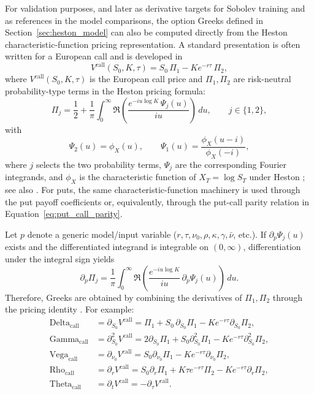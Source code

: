 For validation purposes, and later as derivative targets for Sobolev training and as references in the model comparisons, the option Greeks defined in Section~\ref{sec:heston_model} can also be computed directly from the Heston characteristic-function pricing representation. A standard presentation is often written for a European call \cite{heston} and is developed in \cite[Chapter~1]{rouah_heston_book}
\begin{equation}
V^{\mathrm{call}}(S_0,K,\tau)=S_0\,\Pi_1-Ke^{-r\tau}\,\Pi_2,
\end{equation}
where $V^{\mathrm{call}}(S_0,K,\tau)$ is the European call price and $\Pi_1,\Pi_2$ are risk-neutral probability-type terms in the Heston pricing formula:
\begin{equation}
\Pi_j=\frac{1}{2}+\frac{1}{\pi}\int_0^\infty
\Re\!\left(
\frac{e^{-iu\log K}\,\Psi_j(u)}{iu}
\right)\,du,\qquad j\in\{1,2\},
\end{equation}
with
\begin{equation}
\Psi_2(u)=\phi_X(u),\qquad
\Psi_1(u)=\frac{\phi_X(u-i)}{\phi_X(-i)},
\end{equation}
where \(j\) selects the two probability terms, \(\Psi_j\) are the corresponding Fourier integrands, and \(\phi_X\) is the characteristic function of \(X_T=\log S_T\) under Heston \cite{heston}; see also \cite[Chapter~1]{rouah_heston_book}. For puts, the same characteristic-function machinery is used through the put payoff coefficients or, equivalently, through the put-call parity relation in Equation~\eqref{eq:put_call_parity}.

Let \(p\) denote a generic model/input variable (\(r,\tau,\nu_0,\rho,\kappa,\gamma,\bar\nu\), etc.). If \(\partial_p\Psi_j(u)\) exists and the differentiated integrand is integrable on \((0,\infty)\), differentiation under the integral sign yields \cite[Chapter~11]{rouah_heston_book}
\begin{equation}
\partial_p\Pi_j=
\frac{1}{\pi}\int_0^\infty
\Re\!\left(
\frac{e^{-iu\log K}}{iu}\,\partial_p\Psi_j(u)
\right)\,du.
\end{equation}
Therefore, Greeks are obtained by combining the derivatives of \(\Pi_1,\Pi_2\) through the pricing identity \cite[Chapter~11]{rouah_heston_book}. For example:
\begin{align}
\mathrm{Delta}_{\mathrm{call}} &=
\partial_{S_0}V^{\mathrm{call}}
=\Pi_1+S_0\,\partial_{S_0}\Pi_1-Ke^{-r\tau}\partial_{S_0}\Pi_2,\\
\mathrm{Gamma}_{\mathrm{call}} &=
\partial^2_{S_0}V^{\mathrm{call}}
=2\partial_{S_0}\Pi_1+S_0\partial^2_{S_0}\Pi_1
-Ke^{-r\tau}\partial^2_{S_0}\Pi_2,\\
\mathrm{Vega}_{\mathrm{call}} &=
\partial_{\nu_0}V^{\mathrm{call}}
=S_0\partial_{\nu_0}\Pi_1-Ke^{-r\tau}\partial_{\nu_0}\Pi_2,\\
\mathrm{Rho}_{\mathrm{call}} &=
\partial_r V^{\mathrm{call}}
=S_0\partial_r\Pi_1
+K\tau e^{-r\tau}\Pi_2
-Ke^{-r\tau}\partial_r\Pi_2,\\
\mathrm{Theta}_{\mathrm{call}} &=
\partial_t V^{\mathrm{call}}
=-\partial_\tau V^{\mathrm{call}}.
\end{align}

